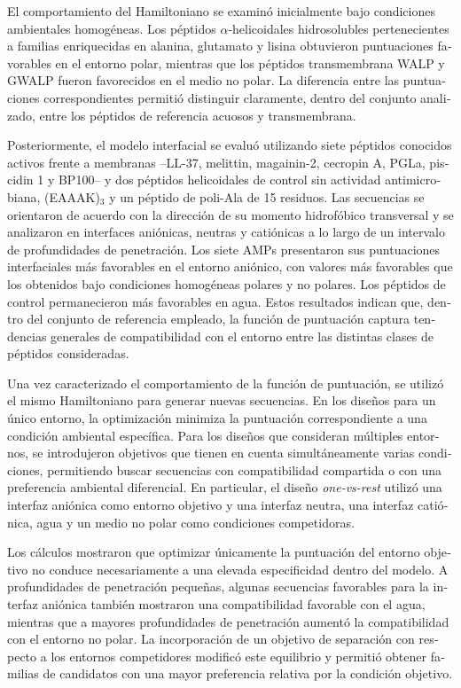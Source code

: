 \begin{otherlanguage}{spanish}
El comportamiento del Hamiltoniano se examinó inicialmente bajo condiciones ambientales homogéneas. Los péptidos $\alpha$-helicoidales hidrosolubles pertenecientes a familias enriquecidas en alanina, glutamato y lisina obtuvieron puntuaciones favorables en el entorno polar, mientras que los péptidos transmembrana WALP y GWALP fueron favorecidos en el medio no polar. La diferencia entre las puntuaciones correspondientes permitió distinguir claramente, dentro del conjunto analizado, entre los péptidos de referencia acuosos y transmembrana.

Posteriormente, el modelo interfacial se evaluó utilizando siete péptidos conocidos activos frente a membranas --LL-37, melittin, magainin-2, cecropin A, PGLa, piscidin 1 y BP100-- y dos péptidos helicoidales de control sin actividad antimicrobiana, (EAAAK)$_3$ y un péptido de poli-Ala de 15 residuos. Las secuencias se orientaron de acuerdo con la dirección de su momento hidrofóbico transversal y se analizaron en interfaces aniónicas, neutras y catiónicas a lo largo de un intervalo de profundidades de penetración. Los siete AMPs presentaron sus puntuaciones interfaciales más favorables en el entorno aniónico, con valores más favorables que los obtenidos bajo condiciones homogéneas polares y no polares. Los péptidos de control permanecieron más favorables en agua. Estos resultados indican que, dentro del conjunto de referencia empleado, la función de puntuación captura tendencias generales de compatibilidad con el entorno entre las distintas clases de péptidos consideradas.

Una vez caracterizado el comportamiento de la función de puntuación, se utilizó el mismo Hamiltoniano para generar nuevas secuencias. En los diseños para un único entorno, la optimización minimiza la puntuación correspondiente a una condición ambiental específica. Para los diseños que consideran múltiples entornos, se introdujeron objetivos que tienen en cuenta simultáneamente varias condiciones, permitiendo buscar secuencias con compatibilidad compartida o con una preferencia ambiental diferencial. En particular, el diseño \textit{one-vs-rest} utilizó una interfaz aniónica como entorno objetivo y una interfaz neutra, una interfaz catiónica, agua y un medio no polar como condiciones competidoras.

Los cálculos mostraron que optimizar únicamente la puntuación del entorno objetivo no conduce necesariamente a una elevada especificidad dentro del modelo. A profundidades de penetración pequeñas, algunas secuencias favorables para la interfaz aniónica también mostraron una compatibilidad favorable con el agua, mientras que a mayores profundidades de penetración aumentó la compatibilidad con el entorno no polar. La incorporación de un objetivo de separación con respecto a los entornos competidores modificó este equilibrio y permitió obtener familias de candidatos con una mayor preferencia relativa por la condición objetivo.


\end{otherlanguage}
